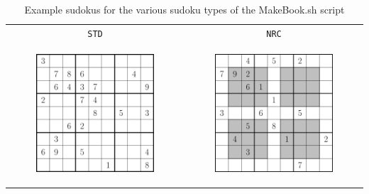 \documentclass[12pt]{article}
\begin{document}
\begin{longtable}{cc}
	\caption{\label{sampletable} Example sudokus for the various sudoku types of the MakeBook.sh script}\\
\hline
\texttt{STD} & \texttt{NRC}\\	
\begin{minipage}{0.45\textwidth}	
	\begin{center}
		\includegraphics[width=0.7\textwidth]{STD}	
	\end{center}
\end{minipage} &
\begin{minipage}{0.45\textwidth}	
	\begin{center}
		\includegraphics[width=0.7\textwidth]{NRC}	
	\end{center}
\end{minipage}

\end{longtable}
\end{document}
